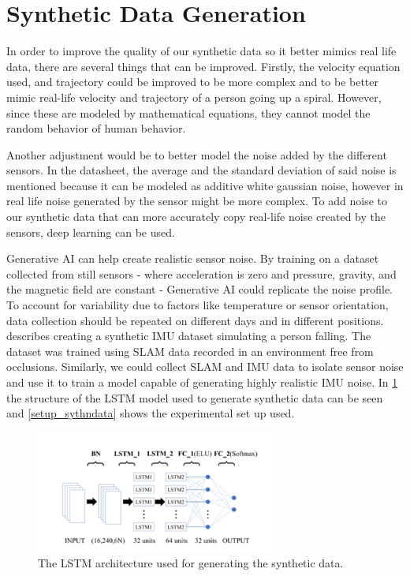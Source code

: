\section{Synthetic Data Generation}
In order to improve the quality of our synthetic data so it better mimics real life data, there are several things that can be improved.
Firstly, the velocity equation used, and trajectory could be improved to be more complex and to be better mimic real-life velocity and trajectory of a person going up a spiral. However, since these are modeled by mathematical equations, they cannot model the random behavior of human behavior. 
\par
Another adjustment would be to better model the noise added by the different sensors. In the datasheet, the average and the standard deviation of said noise is mentioned because it can be modeled as additive white gaussian noise, however in real life noise generated by the sensor might be more complex. To add noise to our synthetic data that can more accurately copy real-life noise created by the sensors, deep learning can be used. 
\par
Generative AI can help create realistic sensor noise. By training on a dataset collected from still sensors - where acceleration is zero and pressure, gravity, and the magnetic field are constant - Generative AI could replicate the noise profile. To account for variability due to factors like temperature or sensor orientation, data collection should be repeated on different days and in different positions. 
\cite{tang_2024_synthetic} describes creating a synthetic IMU dataset simulating a person falling. The dataset was trained using SLAM data recorded in an environment free from occlusions. Similarly, we could collect SLAM and IMU data to isolate sensor noise and use it to train a model capable of generating highly realistic IMU noise. In \cref{LSTM_synthdata} the structure of the LSTM model used to generate synthetic data can be seen and \cref{setup_sythndata} shows the experimental set up used.
\begin{figure}[h] 
	\centering \includegraphics[height=4cm]{./images/LSTMsynth.png}
	\caption{The LSTM architecture used for generating the synthetic data.}
	\label{LSTM_synthdata}
\end{figure}
